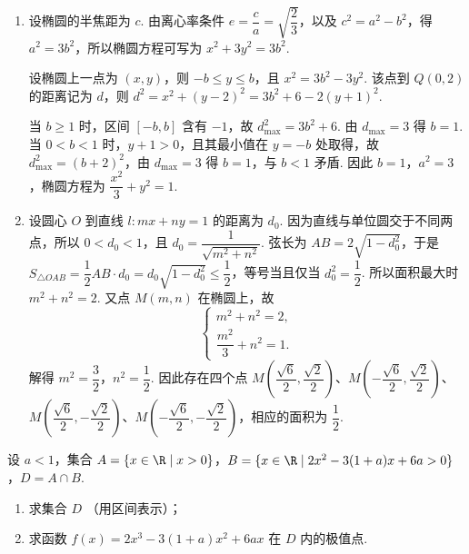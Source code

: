 \begin{solution}
\begin{enumerate}
\item 设椭圆的半焦距为 \(c\). 由离心率条件 \(e=\dfrac{c}{a}=\sqrt{\dfrac{2}{3}}\)，以及 \(c^2=a^2-b^2\)，得 \(a^2=3b^2\)，所以椭圆方程可写为 \(x^2+3y^2=3b^2\).

设椭圆上一点为 \((x,y)\)，则 \(-b\leqslant y\leqslant b\)，且 \(x^2=3b^2-3y^2\). 该点到 \(Q(0,2)\) 的距离记为 \(d\)，则
\(d^2=x^2+(y-2)^2=3b^2+6-2(y+1)^2\).

当 \(b\geqslant1\) 时，区间 \([-b,b]\) 含有 \(-1\)，故 \(d_{\max}^2=3b^2+6\). 由 \(d_{\max}=3\) 得 \(b=1\). 当 \(0<b<1\) 时，\(y+1>0\)，且其最小值在 \(y=-b\) 处取得，故 \(d_{\max}^2=(b+2)^2\)，由 \(d_{\max}=3\) 得 \(b=1\)，与 \(b<1\) 矛盾. 因此 \(b=1\)，\(a^2=3\)，椭圆方程为 \(\dfrac{x^2}{3}+y^2=1\).
\item 设圆心 \(O\) 到直线 \(l:mx+ny=1\) 的距离为 \(d_0\). 因为直线与单位圆交于不同两点，所以 \(0<d_0<1\)，且 \(d_0=\dfrac{1}{\sqrt{m^2+n^2}}\). 弦长为 \(AB=2\sqrt{1-d_0^2}\)，于是
\(S_{\triangle OAB}=\dfrac{1}{2}AB\cdot d_0=d_0\sqrt{1-d_0^2}\leqslant\dfrac{1}{2}\)，等号当且仅当 \(d_0^2=\dfrac{1}{2}\). 所以面积最大时 \(m^2+n^2=2\). 又点 \(M(m,n)\) 在椭圆上，故
\[
\begin{cases}
m^2+n^2=2,\\
\dfrac{m^2}{3}+n^2=1.
\end{cases}
\]
解得 \(m^2=\dfrac{3}{2}\)，\(n^2=\dfrac{1}{2}\). 因此存在四个点
\(M\left(\dfrac{\sqrt{6}}{2},\dfrac{\sqrt{2}}{2}\right)\)、\(M\left(-\dfrac{\sqrt{6}}{2},\dfrac{\sqrt{2}}{2}\right)\)、\(M\left(\dfrac{\sqrt{6}}{2},-\dfrac{\sqrt{2}}{2}\right)\)、\(M\left(-\dfrac{\sqrt{6}}{2},-\dfrac{\sqrt{2}}{2}\right)\)，相应的面积为 \(\dfrac{1}{2}\).
\end{enumerate}
\end{solution}

\begin{problem}
设 \(a < 1\)，集合 \(A = \{x \in \R \mid x > 0\}\)，\(B = \{x \in \R \mid 2x^2 - 3(1 + a)x + 6a > 0\}\)，\(D = A \cap B\).
\begin{enumerate}
\item 求集合 \(D\) （用区间表示）；
\item 求函数 \( f(x) = 2x^3 - 3(1 + a)x^2 + 6ax \) 在 \(D\) 内的极值点.
\end{enumerate}
\end{problem}

